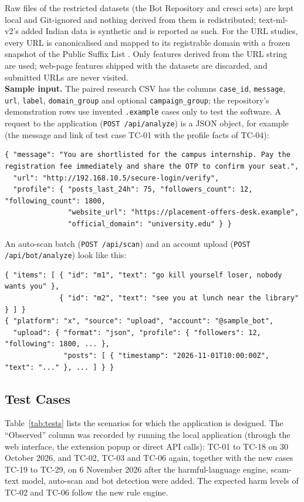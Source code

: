 \noindent Raw files of the restricted datasets (the Bot Repository and cresci sets) are kept local and Git-ignored and nothing derived from them is redistributed; text-ml-v2's added Indian data is synthetic and is reported as such. For the URL studies, every URL is canonicalised and mapped to its registrable domain with a frozen snapshot of the Public Suffix List \cite{psl}. Only features derived from the URL string are used; web-page features shipped with the datasets are discarded, and submitted URLs are never visited.\\

\noindent\textbf{Sample input.} The paired research CSV has the columns \texttt{case\_id}, \texttt{message}, \texttt{url}, \texttt{label}, \texttt{domain\_group} and optional \texttt{campaign\_group}; the repository's demonstration rows use invented \texttt{.example} cases only to test the software. A request to the application (\texttt{POST /api/analyze}) is a JSON object, for example (the message and link of test case TC-01 with the profile facts of TC-04):
\begin{lstlisting}[style=json]
{ "message": "You are shortlisted for the campus internship. Pay the registration fee immediately and share the OTP to confirm your seat.",
  "url": "http://192.168.10.5/secure-login/verify",
  "profile": { "posts_last_24h": 75, "followers_count": 12, "following_count": 1800,
               "website_url": "https://placement-offers-desk.example",
               "official_domain": "university.edu" } }
\end{lstlisting}
\noindent An auto-scan batch (\texttt{POST /api/scan}) and an account upload (\texttt{POST /api/bot/analyze}) look like this:
\begin{lstlisting}[style=json]
{ "items": [ { "id": "m1", "text": "go kill yourself loser, nobody wants you" },
             { "id": "m2", "text": "see you at lunch near the library" } ] }
{ "platform": "x", "source": "upload", "account": "@sample_bot",
  "upload": { "format": "json", "profile": { "followers": 12, "following": 1800, ... },
              "posts": [ { "timestamp": "2026-11-01T10:00:00Z", "text": "..." }, ... ] } }
\end{lstlisting}

\subsection{Test Cases}
\noindent Table~\ref{tab:tests} lists the scenarios for which the application is designed. The ``Observed'' column was recorded by running the local application (through the web interface, the extension popup or direct API calls): TC-01 to TC-18 on 30 October 2026, and TC-02, TC-03 and TC-06 again, together with the new cases TC-19 to TC-29, on 6 November 2026 after the harmful-language engine, scam-text model, auto-scan and bot detection were added. The expected harm levels of TC-02 and TC-06 follow the new rule engine.

